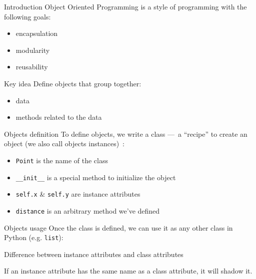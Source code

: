 \begin{frame}{Introduction}
  Object Oriented Programming is a style of programming with the following goals:

  \begin{itemize}
    \item encapsulation
    \item modularity
    \item reusability
  \end{itemize}
\end{frame}

\begin{frame}{Key idea}
  Define \alert{objects} that group together:

  \begin{itemize}
    \item data
    \item methods related to the data
  \end{itemize}
\end{frame}

\begin{frame}{Objects definition}
  To define objects, we write a class ---~a “recipe” to create an object (we also call objects instances)~:


  \begin{itemize}
    \item \texttt{Point} is the name of the class
    \item \texttt{\_\_init\_\_} is a special method to initialize the object
    \item \texttt{self.x} \& \texttt{self.y} are instance attributes
    \item \texttt{distance} is an arbitrary method we've defined
  \end{itemize}
\end{frame}

\begin{frame}{Objects usage}
  Once the class is defined, we can use it as any other class in Python (e.g. \texttt{list}):

\end{frame}

\begin{frame}{Difference between instance attributes and class attributes}

  If an instance attribute has the same name as a class attribute, it will shadow it.
\end{frame}

